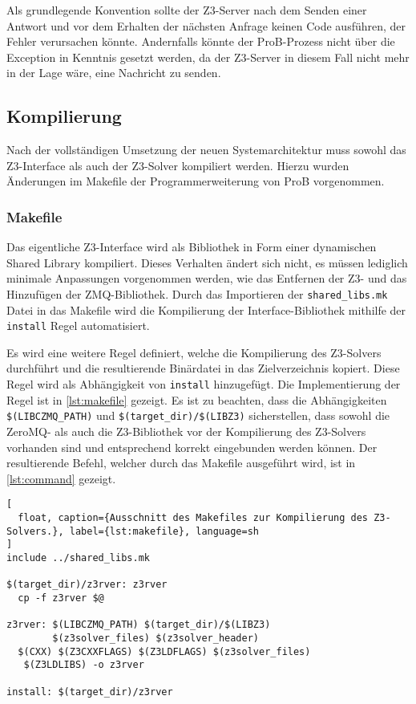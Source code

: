Als grundlegende Konvention sollte der Z3-Server nach dem Senden einer Antwort und vor dem Erhalten der nächsten Anfrage keinen Code ausführen, der Fehler verursachen könnte.
Andernfalls könnte der ProB-Prozess nicht über die Exception in Kenntnis gesetzt werden, da der Z3-Server in diesem Fall nicht mehr in der Lage wäre, eine Nachricht zu senden.

\subsection{Kompilierung}

Nach der vollständigen Umsetzung der neuen Systemarchitektur muss sowohl das Z3-Interface als auch der Z3-Solver kompiliert werden.
Hierzu wurden Änderungen im Makefile der Programmerweiterung von ProB vorgenommen.

\subsubsection{Makefile}

Das eigentliche Z3-Interface wird als Bibliothek in Form einer dynamischen Shared Library kompiliert.
Dieses Verhalten ändert sich nicht, es müssen lediglich minimale Anpassungen vorgenommen werden, wie das Entfernen der Z3- und das Hinzufügen der ZMQ-Bibliothek.
Durch das Importieren der \texttt{shared\_libs.mk} Datei in das Makefile wird die Kompilierung der Interface-Bibliothek mithilfe der \texttt{install} Regel automatisiert.

Es wird eine weitere Regel definiert, welche die Kompilierung des Z3-Solvers durchführt und die resultierende Binärdatei in das Zielverzeichnis kopiert.
Diese Regel wird als Abhängigkeit von \texttt{install} hinzugefügt.
Die Implementierung der Regel ist in \cref{lst:makefile} gezeigt.
Es ist zu beachten, dass die Abhängigkeiten \texttt{\$(LIBCZMQ\_PATH)} und \texttt{\$(target\_dir)/\$(LIBZ3)} sicherstellen,
dass sowohl die ZeroMQ- als auch die Z3-Bibliothek vor der Kompilierung des Z3-Solvers vorhanden sind und entsprechend korrekt eingebunden werden können.
Der resultierende Befehl, welcher durch das Makefile ausgeführt wird, ist in \cref{lst:command} gezeigt.

\begin{lstlisting}[
  float, caption={Ausschnitt des Makefiles zur Kompilierung des Z3-Solvers.}, label={lst:makefile}, language=sh
]
include ../shared_libs.mk

$(target_dir)/z3rver: z3rver
  cp -f z3rver $@

z3rver: $(LIBCZMQ_PATH) $(target_dir)/$(LIBZ3)
        $(z3solver_files) $(z3solver_header)
  $(CXX) $(Z3CXXFLAGS) $(Z3LDFLAGS) $(z3solver_files)
   $(Z3LDLIBS) -o z3rver

install: $(target_dir)/z3rver
\end{lstlisting}

